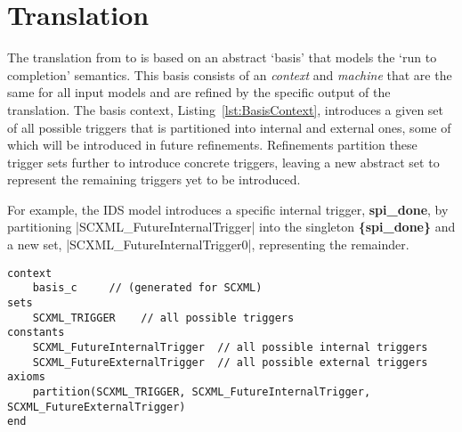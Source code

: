 
\section{\SCXML Translation}
\label{sec:translation}

The translation from \SCXML to \EVENTB is based on an abstract `basis' that models the `run to completion' semantics. 
This basis consists of an \EVENTB \emph{context} and \emph{machine} that are the same for all input models and are refined by the specific output of the translation.  
The basis context, Listing~\ref{lst:BasisContext}, introduces a given set of all possible triggers that is partitioned into internal and external ones, some of which will be introduced in future refinements. 
Refinements partition these trigger sets further to introduce concrete triggers, leaving a new abstract set to represent the remaining triggers yet to be introduced. 

For example, the IDS model introduces a specific internal trigger, \textbf{spi\_done},  by partitioning |SCXML_FutureInternalTrigger| into the singleton \textbf{\{spi\_done\}} and a new set, |SCXML_FutureInternalTrigger0|, representing the remainder. 

\begin{lstlisting}[caption={Abstract basis context},label={lst:BasisContext}, language=Event-B, escapechar=|, frame=single, basicstyle=\rmfamily\scriptsize, belowskip=-2.0 \baselineskip, float=t]
context
	basis_c 	// (generated for SCXML)
sets
	SCXML_TRIGGER	 // all possible triggers
constants
	SCXML_FutureInternalTrigger	 // all possible internal triggers
	SCXML_FutureExternalTrigger	 // all possible external triggers  
axioms
	partition(SCXML_TRIGGER, SCXML_FutureInternalTrigger, SCXML_FutureExternalTrigger) 
end
\end{lstlisting}	


